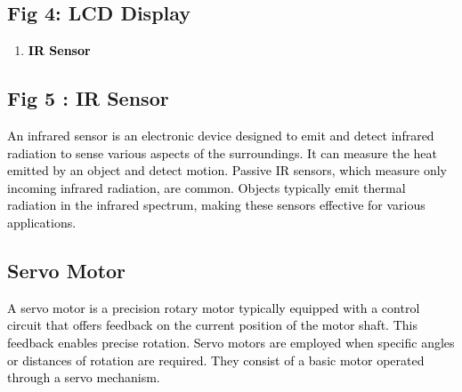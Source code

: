 \documentclass[letterpaper]{article}
\newcounter{saveenum}
\newcommand\liststyleWWNumii{%
\renewcommand\theenumi{\arabic{enumi}}
\renewcommand\labelenumi{\theenumi.}
\renewcommand\labelitemi{{\textbullet}}
\renewcommand\labelitemii{{\textbullet}}
\renewcommand\labelitemiii{{\textbullet}}
}
\begin{document}
\bigskip


\bigskip


\bigskip


\bigskip


\bigskip


\bigskip


\bigskip


\bigskip

\subsection{Fig 4: LCD Display}

\bigskip

\liststyleWWNumii
\setcounter{saveenum}{\value{enumi}}
\begin{enumerate}
\setcounter{enumi}{\value{saveenum}}
\item \textbf{\textcolor{black}{IR Sensor}}
\end{enumerate}

\bigskip


\bigskip


\bigskip


\bigskip


\bigskip


\bigskip


\bigskip


\bigskip

\subsection[Fig 5 : IR Sensor]{Fig 5 : IR Sensor}
\textcolor{black}{An infrared sensor is an electronic device designed to emit and detect infrared radiation to sense
various aspects of the surroundings. It can measure the heat emitted by an object and detect motion. Passive IR
sensors, which measure only incoming infrared radiation, are common. Objects typically emit thermal radiation in the
infrared spectrum, making these sensors effective for various applications.}


\bigskip


\bigskip

\subsection{Servo Motor}
\textcolor{black}{A servo motor is a precision rotary motor typically equipped with a control circuit that offers
feedback on the current position of the motor shaft. This feedback enables precise rotation. Servo motors are employed
when specific angles or distances of rotation are required. They consist of a basic motor operated through a servo
mechanism.}
\end{document}

